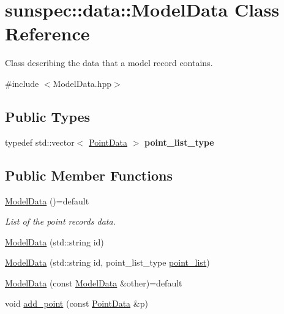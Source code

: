 \hypertarget{structsunspec_1_1data_1_1_model_data}{}\section{sunspec\+:\+:data\+:\+:Model\+Data Class Reference}
\label{structsunspec_1_1data_1_1_model_data}


Class describing the data that a model record contains.  




{\ttfamily \#include $<$Model\+Data.\+hpp$>$}

\subsection*{Public Types}
\begin{DoxyCompactItemize}
\item 
\mbox{\label{structsunspec_1_1data_1_1_model_data_aa2eee8c837ea4468fbcc48117308f40f}} 
typedef std\+::vector$<$ \hyperlink{structsunspec_1_1data_1_1_point_data}{Point\+Data} $>$ {\bfseries point\+\_\+list\+\_\+type}
\end{DoxyCompactItemize}
\subsection*{Public Member Functions}
\begin{DoxyCompactItemize}
\item 
\hyperlink{structsunspec_1_1data_1_1_model_data_a53328bff6dd8917ffa55c9d762fef749}{Model\+Data} ()=default
\begin{DoxyCompactList}\small\item\em List of the point records\textquotesingle{} data. \end{DoxyCompactList}\item 
\hyperlink{structsunspec_1_1data_1_1_model_data_a4d6d2c13fa5269474abed182ef4f4c64}{Model\+Data} (std\+::string id)
\item 
\hyperlink{structsunspec_1_1data_1_1_model_data_adcdfa2333a1448db04cf1cbe6ce9e964}{Model\+Data} (std\+::string id, point\+\_\+list\+\_\+type \hyperlink{structsunspec_1_1data_1_1_model_data_a15540f6f5da7d0f4c142b1ef57f02bf8}{point\+\_\+list})
\item 
\hyperlink{structsunspec_1_1data_1_1_model_data_a3f47ecb677834f0ebf13c8899af4d773}{Model\+Data} (const \hyperlink{structsunspec_1_1data_1_1_model_data}{Model\+Data} \&other)=default
\item 
void \hyperlink{structsunspec_1_1data_1_1_model_data_a80fa5b7f27208d240bf59944eac3eb04}{add\+\_\+point} (const \hyperlink{structsunspec_1_1data_1_1_point_data}{Point\+Data} \&p)
\end{DoxyCompactItemize}
